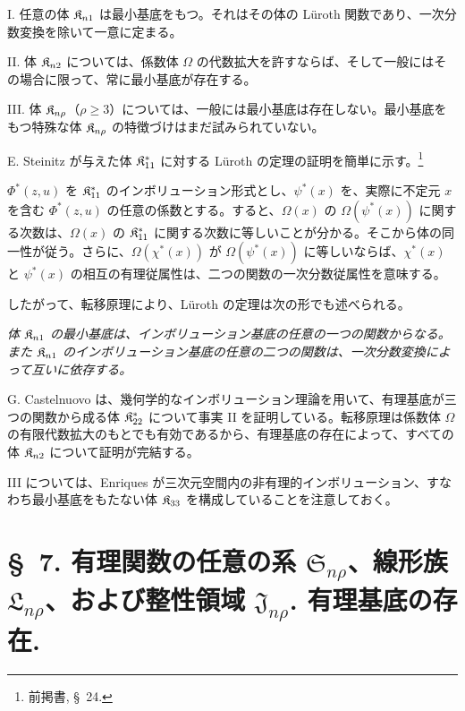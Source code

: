 \documentclass[11pt]{jlreq}
\newcommand{\eps}{\varepsilon}
\begin{document}
I. 任意の体 $\Kfield_{n1}$ は最小基底をもつ。それはその体の Lüroth 関数であり、一次分数変換を除いて一意に定まる。

II. 体 $\Kfield_{n2}$ については、係数体 $\Omega$ の代数拡大を許すならば、そして一般にはその場合に限って、常に最小基底が存在する。

III. 体 $\Kfield_{n\rho}$（$\rho\ge3$）については、一般には最小基底は存在しない。最小基底をもつ特殊な体 $\Kfield_{n\rho}$ の特徴づけはまだ試みられていない。

E. Steinitz が与えた体 $\Kfield^*_{11}$ に対する Lüroth の定理の証明を簡単に示す。\footnote{前掲書, \S\ 24.}

$\Phi^*(z,u)$ を $\Kfield^*_{11}$ のインボリューション形式とし、$\psi^*(x)$ を、実際に不定元 $x$ を含む $\Phi^*(z,u)$ の任意の係数とする。すると、$\Omega(x)$ の $\Omega(\psi^*(x))$ に関する次数は、$\Omega(x)$ の $\Kfield^*_{11}$ に関する次数に等しいことが分かる。そこから体の同一性が従う。さらに、$\Omega(\chi^*(x))$ が $\Omega(\psi^*(x))$ に等しいならば、$\chi^*(x)$ と $\psi^*(x)$ の相互の有理従属性は、二つの関数の一次分数従属性を意味する。

したがって、転移原理により、Lüroth の定理は次の形でも述べられる。

\emph{体 $\Kfield_{n1}$ の最小基底は、インボリューション基底の任意の一つの関数からなる。また $\Kfield_{n1}$ のインボリューション基底の任意の二つの関数は、一次分数変換によって互いに依存する。}

G. Castelnuovo は、幾何学的なインボリューション理論を用いて、有理基底が三つの関数から成る体 $\Kfield^*_{22}$ について事実 II を証明している。転移原理は係数体 $\Omega$ の有限代数拡大のもとでも有効であるから、有理基底の存在によって、すべての体 $\Kfield_{n2}$ について証明が完結する。

III については、Enriques が三次元空間内の非有理的インボリューション、すなわち最小基底をもたない体 $\Kfield_{33}$ を構成していることを注意しておく。

\providecommand{\Kfield}{\mathfrak{K}}
\providecommand{\Ssys}{\mathfrak{S}}
\providecommand{\Jdom}{\mathfrak{J}}
\providecommand{\Gdom}{\mathfrak{G}}
\providecommand{\Lsys}{\mathfrak{L}}
\providecommand{\Omegaint}{[\Omega]}
\providecommand{\eps}{\varepsilon}

\section*{\S\ 7. 有理関数の任意の系 $\Ssys_{n\rho}$、線形族 $\Lsys_{n\rho}$、および整性領域 $\Jdom_{n\rho}$. 有理基底の存在.}
\end{document}
